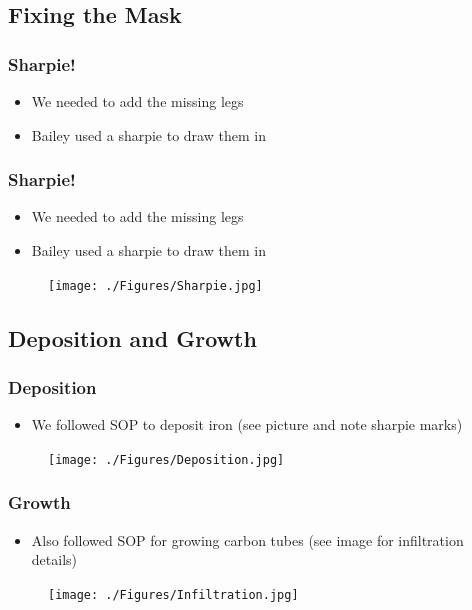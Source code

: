 \documentclass[11pt]{beamer}
\theoremstyle{definition}
\begin{document}
  \subsection{Fixing the Mask} \label{sub:fixing_the_mask}

    \begin{frame} [t]\frametitle{Sharpie!}
      \begin{itemize}[<+->]
        \item We needed to add the missing legs
        \item Bailey used a sharpie to draw them in
      \end{itemize}
    \end{frame}

    \begin{frame} [t]\frametitle{Sharpie!}
      \begin{itemize}
        \item We needed to add the missing legs
        \item Bailey used a sharpie to draw them in
      \end{itemize}
      \begin{figure}[ht]
          \centering
          \texttt{[image: ./Figures/Sharpie.jpg]}
          \label{fig:sharpie}
      \end{figure}
    \end{frame}

  \subsection{Deposition and Growth} \label{sub:deposition_and_growth}

    \begin{frame} \frametitle{Deposition}
      \begin{itemize}[<+->]
        \item We followed SOP to deposit iron (see picture and note sharpie marks)
      \end{itemize}
      \begin{figure}[ht]
          \centering
          \texttt{[image: ./Figures/Deposition.jpg]}
          \label{fig:deposition}
      \end{figure}
    \end{frame}

  \begin{frame} \frametitle{Growth}
      \begin{itemize}[<+->]
        \item Also followed SOP for growing carbon tubes (see image for infiltration details)
      \end{itemize}
      \begin{figure}[ht]
          \centering
          \texttt{[image: ./Figures/Infiltration.jpg]}
          \label{fig:infiltration}
      \end{figure}
    \end{frame}
\end{document}

